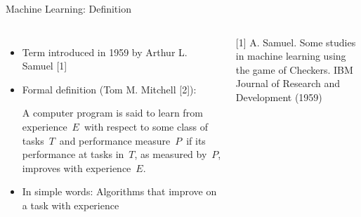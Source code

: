 \documentclass[aspectratio=169,10pt]{beamer}
\begin{document}
\begin{frame}{Machine Learning: Definition}
	\begin{columns}
		\begin{itemize}
			\item Term introduced in 1959 by Arthur L. Samuel [1]
			\pause 
			\vspace{0.3cm}
			\item Formal definition (Tom M. Mitchell [2]):
			
			A computer program is said to learn from experience $E$ with respect to some class of tasks $T$ and performance measure $P$ if its performance at tasks in $T$, as measured by $P$, improves with experience $E$.
			
		\pause \vspace{0.3cm}
			\item In simple words: Algorithms that improve on a task with experience	
		\end{itemize}
	\vspace{0.8cm}
{\footnotesize [1] A. Samuel. Some studies in machine learning using the game of Checkers. IBM Journal of Research and Development (1959)} %


\end{columns}
\end{frame}
\end{document}

